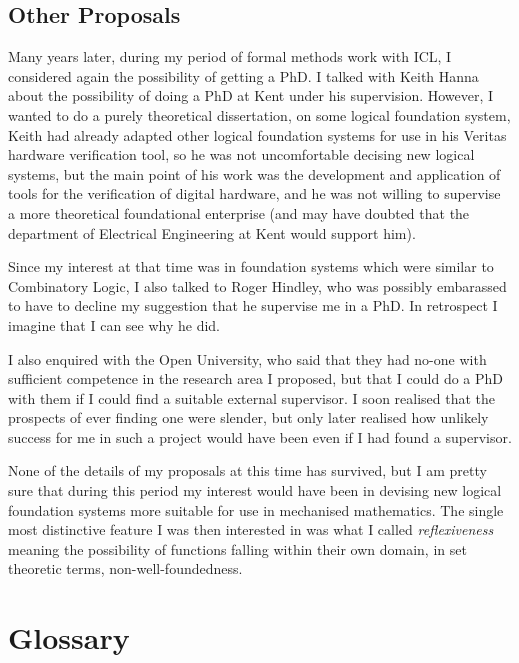 \documentclass[10pt,titlepage]{book}
\begin{document}
\section{Other Proposals}

Many years later, during my period of formal methods work with ICL, I considered again the possibility of getting a PhD.
I talked with Keith Hanna about the possibility of doing a PhD at Kent under his supervision.
However, I wanted to do a purely theoretical dissertation, on some logical foundation system,
Keith had already adapted other logical foundation systems for use in his Veritas hardware verification tool, so he was not uncomfortable decising new logical systems, but the main point of his work was the development and application of tools for the verification of digital hardware, and he was not willing to supervise a more theoretical foundational enterprise (and may have doubted that the department of Electrical Engineering at Kent would support him).

Since my interest at that time was in foundation systems which were similar to Combinatory Logic, I also talked to Roger Hindley, who was possibly embarassed to have to decline my suggestion that he supervise me in a PhD.
In retrospect I imagine that I can see why he did.

I also enquired with the Open University, who said that they had no-one with sufficient competence in the research area I proposed, but that I could do a PhD with them if I could find a suitable external supervisor.
I soon realised that the prospects of ever finding one were slender, but only later realised how unlikely success for me in such a project would have been even if I had found a supervisor.

None of the details of my proposals at this time has survived, but I am pretty sure that during this period my interest would have been in devising new logical foundation systems more suitable for use in mechanised mathematics.
The single most distinctive feature I was then interested in was what I called {\it reflexiveness} meaning the possibility of functions falling within their own domain, in set theoretic terms, non-well-foundedness.

\chapter{Glossary}\label{glossary}
\end{document}
